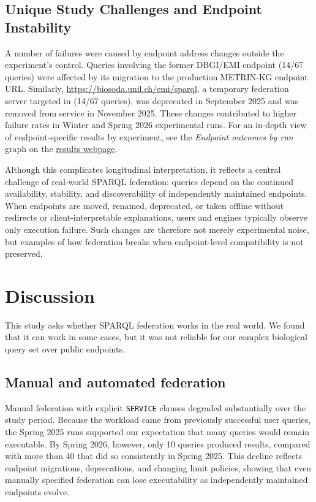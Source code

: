 \documentclass[runningheads]{llncs}
\begin{document}
\subsection{Unique Study Challenges and Endpoint Instability}\label{sec5.5}
A number of failures were caused by endpoint address changes outside the experiment’s control. 
Queries involving the former DBGI/EMI endpoint (14/67 queries) were affected by its migration to the production METRIN-KG endpoint URL. 
Similarly, \url{https://biosoda.unil.ch/emi/sparql}, a temporary federation server targeted in (14/67 queries), was deprecated in September 2025 and was removed from service in November 2025. 
These changes contributed to higher failure rates in Winter and Spring 2026 experimental runs.
For an in-depth view of endpoint-specific results by experiment, see the \textit{Endpoint outcomes by run} graph on the \href{https://ecrum19.github.io/fed-survey-results/}{results webpage}.

Although this complicates longitudinal interpretation, it reflects a central challenge of real-world SPARQL federation: queries depend on the continued availability, stability, and discoverability of independently maintained endpoints. 
When endpoints are moved, renamed, deprecated, or taken offline without redirects or client-interpretable explanations, users and engines typically observe only execution failure. 
Such changes are therefore not merely experimental noise, but examples of how federation breaks when endpoint-level compatibility is not preserved.



\section{Discussion}\label{sec6}

This study asks whether SPARQL federation works in the real world. 
We found that it can work in some cases, but it was not reliable for our complex biological query set over public endpoints.

\subsection{Manual and automated federation}\label{sec6.1}
Manual federation with explicit \texttt{SERVICE} clauses degraded substantially over the study period. 
Because the workload came from previously successful user queries, the Spring 2025 runs supported our expectation that many queries would remain executable. 
By Spring 2026, however, only 10 queries produced results, compared with more than 40 that did so consistently in Spring 2025. 
This decline reflects endpoint migrations, deprecations, and changing limit policies, showing that even manually specified federation can lose executability as independently maintained endpoints evolve.
\end{document}
